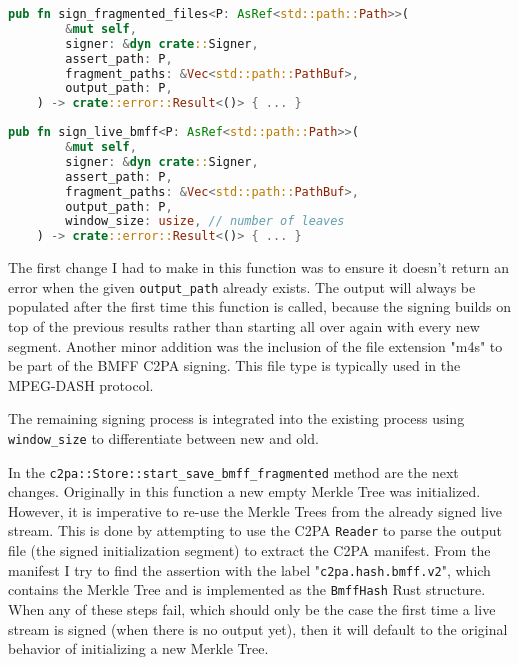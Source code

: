 \begin{minipage}{0.95\linewidth}
\begin{lstlisting}[caption={Original Signing Function}, label=code:fragment_bmff, language=Rust, captionpos=b]
    pub fn sign_fragmented_files<P: AsRef<std::path::Path>>(
        &mut self,
        signer: &dyn crate::Signer,
        assert_path: P,
        fragment_paths: &Vec<std::path::PathBuf>,
        output_path: P,
    ) -> crate::error::Result<()> { ... }
\end{lstlisting}
\end{minipage}

\begin{minipage}{0.95\linewidth}
\begin{lstlisting}[caption={New Live Signing Function}, label=code:live_sign, language=Rust, captionpos=b]
    pub fn sign_live_bmff<P: AsRef<std::path::Path>>(
        &mut self,
        signer: &dyn crate::Signer,
        assert_path: P,
        fragment_paths: &Vec<std::path::PathBuf>,
        output_path: P,
        window_size: usize, // number of leaves
    ) -> crate::error::Result<()> { ... }
\end{lstlisting}
\end{minipage}

The first change I had to make in this function was to ensure it doesn't return an error when the given \texttt{output\_path} already exists. The output will always be populated after the first time this function is called, because the signing builds on top of the previous results rather than starting all over again with every new segment. Another minor addition was the inclusion of the file extension "m4s" to be part of the BMFF C2PA signing. This file type is typically used in the MPEG-DASH protocol.

The remaining signing process is integrated into the existing process using \texttt{window\_size} to differentiate between new and old.

In the \texttt{c2pa::Store::start\_save\_bmff\_fragmented} method are the next changes. Originally in this function a new empty Merkle Tree was initialized. However, it is imperative to re-use the Merkle Trees from the already signed live stream. This is done by attempting to use the C2PA \texttt{Reader} to parse the output file (the signed initialization segment) to extract the C2PA manifest. From the manifest I try to find the assertion with the label "\texttt{c2pa.hash.bmff.v2}", which contains the Merkle Tree and is implemented as the \texttt{BmffHash} Rust structure. When any of these steps fail, which should only be the case the first time a live stream is signed (when there is no output yet), then it will default to the original behavior of initializing a new Merkle Tree.

